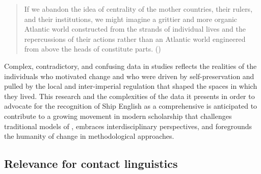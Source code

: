 \begin{quotation}
If we abandon the idea of centrality of the mother countries, their rulers, and their institutions, we might imagine a grittier and more organic Atlantic world constructed from the strands of individual lives and the repercussions of their actions rather than an Atlantic world engineered from above the heads of constitute parts. (\citealt{Daniels2015})
\end{quotation}

Complex, contradictory, and confusing data in  studies reflects the realities of the individuals who motivated  change and who were driven by self-preservation and pulled by the local and inter-imperial regulation that shaped the spaces in which they lived. This research and the complexities of the data it presents in order to advocate for the recognition of Ship English as a comprehensive  is anticipated to contribute to a growing movement in modern scholarship that challenges traditional models of , embraces interdisciplinary perspectives, and foregrounds the humanity of  change in methodological approaches. 

\subsection{{Relevance for contact linguistics}}%

